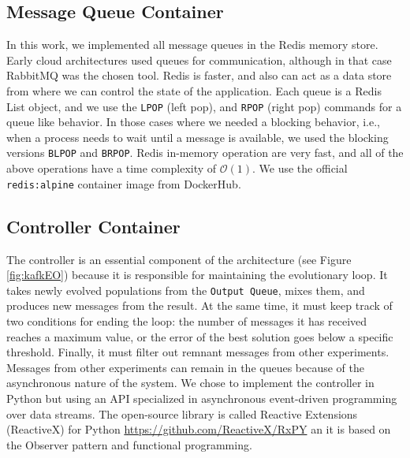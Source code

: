 \documentclass[review]{elsarticle}
\begin{document}
\subsection{Message Queue Container} 
\label{message_container}

In this work, we implemented all message
queues in the Redis memory store. Early cloud architectures
\cite{de2017parallel} used queues for communication, although in that
case RabbitMQ was the chosen tool. Redis is faster, and also can act
as a data store from where we can control the state of the application.
Each queue is a Redis List object, and we use
the \texttt{LPOP} (left pop), and \texttt{RPOP} (right pop) commands for a queue like behavior.
In those cases where we needed a blocking behavior, i.e., when a process needs
to wait until a message is available, we used the blocking versions \texttt{BLPOP} and
\texttt{BRPOP}. Redis in-memory operation are very fast, and all of the above 
operations have a time complexity of $\mathcal{O}(1)$. We use the official 
\texttt{redis:alpine} container image from DockerHub.  

\subsection{Controller Container} 
\label{controller}

The controller is an essential component of the architecture (see Figure \ref{fig:kafkEO})
because it is responsible for maintaining the evolutionary loop. It takes newly
evolved populations from the \texttt{Output Queue}, mixes them,   and produces new
messages from the result. At the same time, it must keep track of two conditions
for ending the loop: the number of messages it has received reaches a maximum
value, or the error of the best solution goes below a specific threshold.  Finally, it
must filter out remnant messages from other experiments. Messages from other
experiments can remain in the queues because of the asynchronous nature of the
system.  We chose to implement the controller in Python but using an API
specialized in asynchronous event-driven programming over data streams.  
The open-source library is called Reactive Extensions (ReactiveX) for Python 
\url{https://github.com/ReactiveX/RxPY} an it is based on the Observer 
pattern \cite{gamma1995design} and functional programming.
\end{document}
